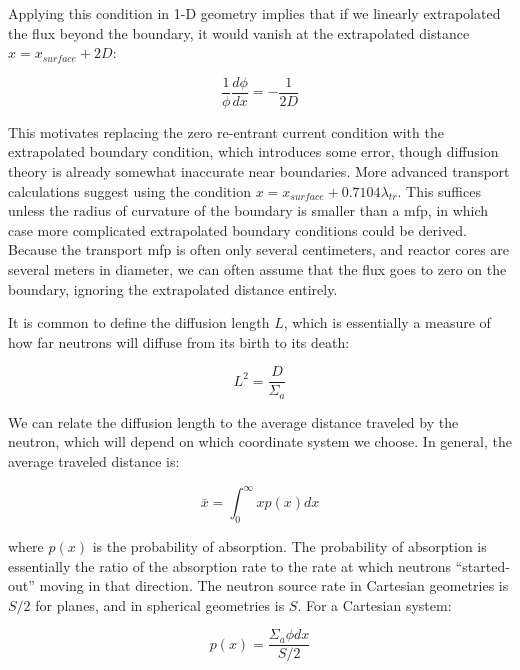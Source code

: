 Applying this condition in 1-D geometry implies that if we linearly extrapolated the flux beyond the boundary, it would vanish at the extrapolated distance \(x = x_{surface} + 2D\):

\begin{equation}
\label{eq:PartialCurrent_BC2}
\frac{1}{\phi}\frac{d\phi}{dx}=-\frac{1}{2D}
\end{equation}

This motivates replacing the zero re-entrant current condition with the extrapolated boundary condition, which introduces some error, though diffusion theory is already somewhat inaccurate near boundaries. More advanced transport calculations suggest using the condition \(x = x_{surface} + 0.7104\lambda_{tr}\). This suffices unless the radius of curvature of the boundary is smaller than a mfp, in which case more complicated extrapolated boundary conditions could be derived. Because the transport mfp is often only several centimeters, and reactor cores are several meters in diameter, we can often assume that the flux goes to zero on the boundary, ignoring the extrapolated distance entirely.

It is common to define the diffusion length \(L\), which is essentially a measure of how far neutrons will diffuse from its birth to its death:

\begin{equation}
\label{eq:DiffusionLength}
L^2=\frac{D}{\Sigma_a}
\end{equation}

We can relate the diffusion length to the average distance traveled by the neutron, which will depend on which coordinate system we choose. In general, the average traveled distance is:

\begin{equation}
\label{eq:AverageDistance}
\bar{x}=\int_{0}^{\infty}xp(x)dx
\end{equation}

where \(p(x)\) is the probability of absorption. The probability of absorption is essentially the ratio of the absorption rate to the rate at which neutrons ``started-out'' moving in that direction. The neutron source rate in Cartesian geometries is \(S/2\) for planes, and in spherical geometries is \(S\). For a Cartesian system:

\begin{equation}
\label{eq:AbsorptionProbability_Cartesian}
p(x)=\frac{\Sigma_a\phi dx}{S/2}
\end{equation}

